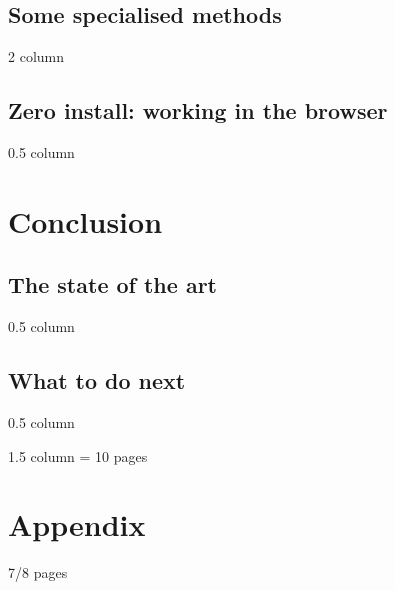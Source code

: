 \documentclass[11pt,oneside]{article}	%
\begin{document}
\subsection{Some specialised methods}
2 column
\subsection{Zero install: working in the browser}
0.5 column
\section{Conclusion}
\subsection{The state of the art}
0.5 column
\subsection{What to do next}
0.5 column



1.5 column
= 10 pages

\appendix
\section{Appendix}

7/8 pages
\end{document}
